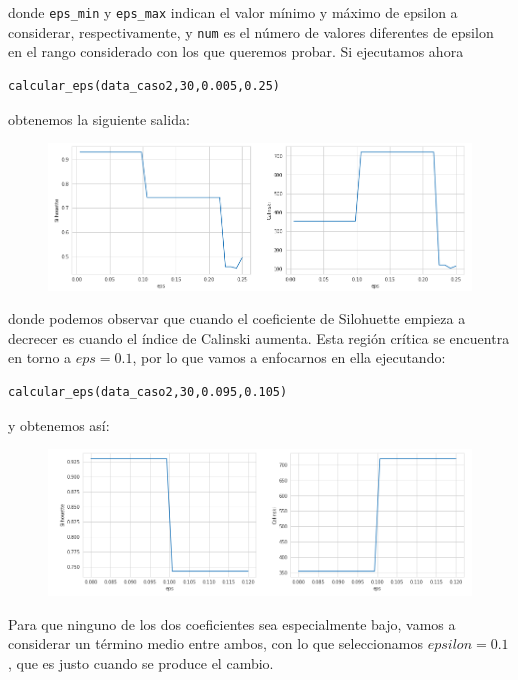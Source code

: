 \documentclass[a4paper,11pt]{book}
\begin{document}
donde \texttt{eps_min} y \texttt{eps_max} indican el valor mínimo y máximo de epsilon a considerar, respectivamente, y \texttt{num} es el número de valores diferentes de epsilon en el rango considerado con los que queremos probar. Si ejecutamos ahora 
\begin{verbatim}
calcular_eps(data_caso2,30,0.005,0.25)
\end{verbatim}
obtenemos la siguiente salida: 
\begin{figure}[H]
	\centering
	\includegraphics[width=1.1\linewidth]{img/epsilon1}
	\caption{}
	\label{fig:epsilon1}
\end{figure}
donde podemos observar que cuando el coeficiente de Silohuette empieza a decrecer es cuando el índice de Calinski aumenta. Esta región crítica se encuentra en torno a $eps=0.1$, por lo que vamos a enfocarnos en ella ejecutando:
\begin{verbatim}
calcular_eps(data_caso2,30,0.095,0.105)
\end{verbatim}
y obtenemos así: 
\begin{figure}[H]
	\centering
	\includegraphics[width=1.1\linewidth]{img/epsilon2}
	\caption{}
	\label{fig:epsilon2}
\end{figure}



Para que ninguno de los dos coeficientes sea especialmente bajo, vamos a considerar un término medio entre ambos, con lo que seleccionamos $epsilon=0.1$, que es justo cuando se produce el cambio. 
\end{document}

